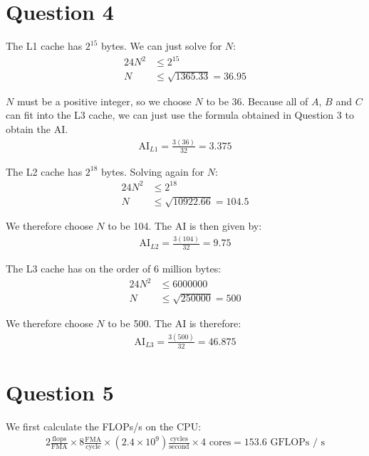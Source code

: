 \documentclass[11pt]{article}
\begin{document}
    \section*{Question 4}
        The L1 cache has $2^{15}$ bytes. We can just solve for $N$:
        \begin{align*}
            24N^2 &\leq 2^{15}\\
            N &\leq \sqrt{1365.33} = 36.95
        \end{align*}

        $N$ must be a positive integer, so we choose $N$ to be 36. Because all of $A$, $B$ and $C$ can fit into the L3 cache, we can just use the formula obtained in Question 3 to obtain the AI. 
        \begin{align*}
            \text{AI}_{L1} = \frac{3(36)}{32} = 3.375
        \end{align*}

        The L2 cache has $2^{18}$ bytes. Solving again for $N$:
        \begin{align*}
            24N^2 &\leq 2^{18}\\
            N &\leq \sqrt{10922.66} = 104.5
        \end{align*}

        We therefore choose $N$ to be 104. The AI is then given by:
        \begin{align*}
            \text{AI}_{L2} = \frac{3(104)}{32} = 9.75
        \end{align*}

        The L3 cache has on the order of 6 million bytes:
        \begin{align*}
            24N^2 &\leq 6000000\\
            N &\leq \sqrt{250000} = 500
        \end{align*}

        We therefore choose $N$ to be 500. The AI is therefore:
        \begin{align*}
            \text{AI}_{L3} = \frac{3(500)}{32} = 46.875
        \end{align*}

    \section*{Question 5}
        We first calculate the FLOPs/s on the CPU:
        \begin{align*}
            2 \frac{\text{flops}}{\text{FMA}} \times 8 \frac{\text{FMA}}{\text{cycle}}\times (2.4\times 10^9)\frac{\text{cycles}}{\text{second}} \times 4\text{ cores} = 153.6 \text{ GFLOPs / s}
        \end{align*}
        
\end{document}
